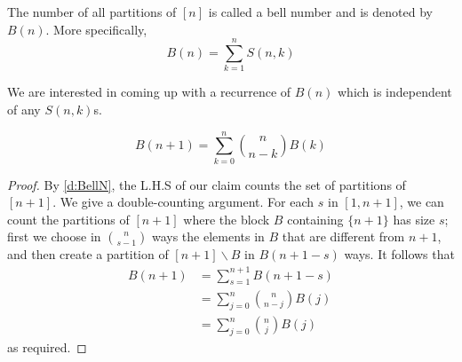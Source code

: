 \begin{definition}
The number of all partitions of $[n]$ is called a bell number and is denoted by $B(n)$. More specifically,
\[
B(n) = \sum_{k=1}^nS(n,k)
\]
\label{d:BellN}
\end{definition}
We are interested in coming up with a recurrence of $B(n)$ which is independent of any $S(n,k)$s. 
\begin{claim}
    \[
    B(n+1) = \sum_{k=0}^{n}\binom{n}{n-k}B(k)
    \]
\end{claim}
\begin{proof}
By \cref{d:BellN}, the L.H.S of our claim counts the set of partitions of $[n + 1]$. We give a double-counting argument. For each $s$ in $[1,n+1]$, we can count the partitions of $[n+1]$ where the block $B$ containing $\{n + 1\}$ has size $s$; first we choose in $\binom{n}{s-1}$ ways the elements in $B$ that are different from $n+1$, and then create a partition of $[n + 1] \backslash B$ in $B(n + 1 - s)$ ways. It follows that 
\begin{align*}
    B(n+1) &= \sum_{s=1}^{n+1}B(n+1-s) \\
    &= \sum_{j=0}^n\binom{n}{n-j}B(j) \\
    &= \sum_{j=0}^n\binom{n}{j}B(j)
\end{align*}
as required. 
\end{proof}
